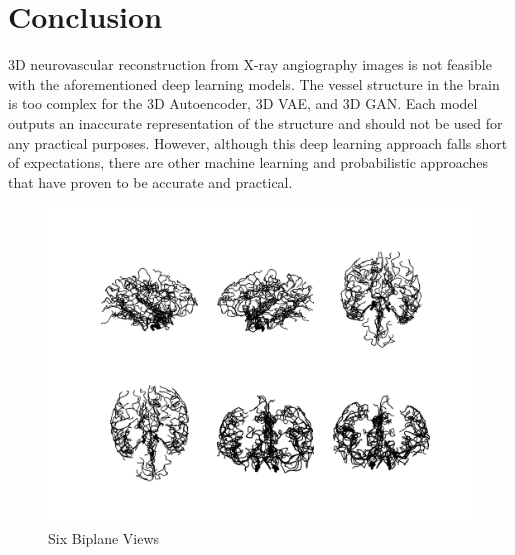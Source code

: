 \documentclass[conference, 10pt]{IEEEtran}
\begin{document}
\section{Conclusion}
3D neurovascular reconstruction from X-ray angiography images is not feasible with the aforementioned deep learning models. The vessel structure in the brain is too complex for the 3D Autoencoder, 3D VAE, and 3D GAN. Each model outputs an inaccurate representation of the structure and should not be used for any practical purposes. However, although this deep learning approach falls short of expectations, there are other machine learning \cite{ML approach}  and probabilistic \cite{Probabililstic approach} approaches that have proven to be accurate and practical. 

\begin{figure}[h]
    \centering
    \includegraphics[scale=0.21]{figure_1.png}
    \caption{Six Biplane Views}
\end{figure}
\end{document}
